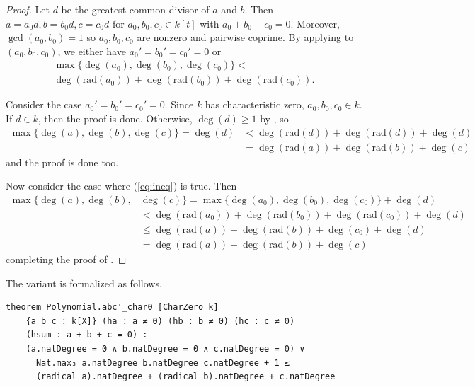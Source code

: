 \documentclass[runningheads]{llncs}
\newcommand{\rad}{\mathrm{rad}}
\begin{document}
\begin{proof}
Let $d$ be the greatest common divisor of $a$ and $b$.
Then $a = a_0 d, b = b_0 d, c = c_0 d$ for $a_0, b_0, c_0 \in k[t]$ with $a_0 + b_0 + c_0 = 0$.
Moreover, $\gcd(a_0, b_0) = 1$ so $a_0, b_0, c_0$ are nonzero and pairwise coprime. By applying  to $(a_0, b_0, c_0)$, we either have $a_0' = b_0' = c_0' = 0$ or
\begin{equation}
\label{eq:ineq}
\begin{gathered}
\max\{\deg(a_0), \deg(b_0), \deg(c_0)\} <  \\ 
\deg (\rad(a_0)) + \deg (\rad(b_0)) + \deg (\rad(c_0)).
\end{gathered}
\end{equation}

Consider the case $a_0' = b_0' = c_0' = 0$. Since $k$ has characteristic zero, $a_0, b_0, c_0 \in k$.
If $d \in k$, then the proof is done. Otherwise, $\deg (d) \geq 1$ by , so
\begin{align*}
\max\{\deg(a), \deg(b), \deg(c)\} = \deg(d) & < \deg (\rad(d)) + \deg (\rad(d)) + \deg (d) \\
& = \deg (\rad(a)) + \deg (\rad(b)) + \deg (c)
\end{align*}
and the proof is done too.

Now consider the case where (\ref{eq:ineq}) is true. Then
\begin{align*}
\max\{\deg(a), \deg(b), & \deg(c)\} = \max\{\deg(a_0), \deg(b_0), \deg(c_0)\} + \deg(d) \\
& < \deg (\rad(a_0)) + \deg (\rad(b_0)) + \deg (\rad(c_0)) + \deg (d) \\
& \leq \deg (\rad(a)) + \deg (\rad(b)) + \deg (c_0) + \deg(d) \\
& = \deg (\rad(a)) + \deg (\rad(b)) + \deg (c)
\end{align*}
completing the proof of .
\end{proof}

The variant  is formalized as follows.
\begin{verbatim}
theorem Polynomial.abc'_char0 [CharZero k]
    {a b c : k[X]} (ha : a ≠ 0) (hb : b ≠ 0) (hc : c ≠ 0)
    (hsum : a + b + c = 0) :
    (a.natDegree = 0 ∧ b.natDegree = 0 ∧ c.natDegree = 0) ∨
      Nat.max₃ a.natDegree b.natDegree c.natDegree + 1 ≤
      (radical a).natDegree + (radical b).natDegree + c.natDegree
\end{verbatim}
\end{document}
